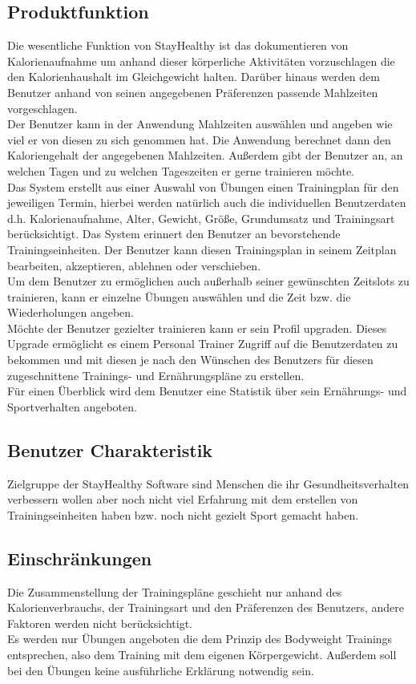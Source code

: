 \documentclass[12pt,a4paper,onecolumn]{article}
\begin{document}
\subsection{Produktfunktion}
Die wesentliche Funktion von StayHealthy ist das dokumentieren von Kalorienaufnahme um anhand dieser körperliche Aktivitäten vorzuschlagen die den Kalorienhaushalt im Gleichgewicht halten.
Darüber hinaus werden dem Benutzer anhand von seinen angegebenen Präferenzen passende \gls{Mahlzeit}en vorgeschlagen.
\\Der Benutzer kann in der Anwendung \gls{Mahlzeit}en auswählen und angeben wie viel er von diesen zu sich genommen hat. Die Anwendung berechnet dann den Kaloriengehalt der angegebenen \gls{Mahlzeit}en. Außerdem gibt der Benutzer an, an welchen Tagen und zu welchen Tageszeiten er gerne trainieren möchte. 
\\Das System erstellt aus einer Auswahl von \gls{Übung}en einen Trainingplan für den jeweiligen Termin, hierbei werden natürlich auch die individuellen Benutzerdaten d.h. Kalorienaufnahme, Alter, Gewicht, Größe, Grundumsatz und Trainingsart berücksichtigt. Das System erinnert den Benutzer an bevorstehende \gls{Trainingseinheit}en. Der Benutzer kann diesen \gls{Trainingsplan} in seinem Zeitplan bearbeiten, akzeptieren, ablehnen oder verschieben. \\Um dem Benutzer zu ermöglichen auch außerhalb seiner gewünschten Zeitslots zu trainieren, kann er einzelne \gls{Übung}en auswählen und die Zeit bzw. die Wiederholungen angeben. \\
Möchte der Benutzer gezielter trainieren kann er sein Profil upgraden. Dieses Upgrade ermöglicht es einem Personal Trainer Zugriff auf die Benutzerdaten zu bekommen und mit diesen je nach den Wünschen des Benutzers für diesen zugeschnittene Trainings- und Ernährungspläne zu erstellen.\\
Für einen Überblick wird dem Benutzer eine Statistik über sein Ernährungs- und Sportverhalten angeboten.\\
\newpage
\subsection{Benutzer Charakteristik}
Zielgruppe der StayHealthy Software sind Menschen die ihr Gesundheitsverhalten verbessern wollen aber noch nicht viel Erfahrung mit dem erstellen von \gls{Trainingseinheit}en haben bzw. noch nicht gezielt Sport gemacht haben.
\subsection{Einschränkungen}
Die Zusammenstellung der Trainingspläne geschieht nur anhand des Kalorienverbrauchs, der Trainingsart und den Präferenzen des Benutzers, andere Faktoren werden nicht berücksichtigt.
\\Es werden nur \gls{Übung}en angeboten die dem Prinzip des Bodyweight Trainings entsprechen, also dem Training mit dem eigenen Körpergewicht. Außerdem soll bei den \gls{Übung}en keine ausführliche Erklärung notwendig sein.\\
\end{document}
